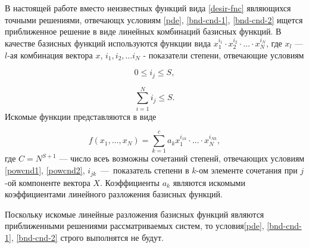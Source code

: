 \documentclass[a4paper,12pt]{article}
\begin{document}
В настоящей работе вместо неизвестных функций вида \eqref{desir-fnc}
являющихся точными решениями, отвечающх условиям \eqref{pde},
\eqref{bnd-cnd-1}, \eqref{bnd-cnd-2} ищется приближенное решение
в виде линейных комбинаций базисных функций. В качестве базисных функций
используются функции вида $x^{i_1}_1 \cdot x^{i_2}_2 \cdot \ldots \cdot
x^{i_N}_N$, где $x_l$ --- $l$-ая комбинация вектора $x$, $i_1,i_2,\ldots
i_N$ - показатели степени, отвечающие условиям

\begin{equation}
    0 \le i_j \le S,
    \label{powcnd1}
\end{equation}

\begin{equation}
    \sum^{N}_{i=1} i_j \le S.
    \label{powcnd2}
\end{equation}
Искомые функции представляются в виде

\begin{equation}
    f(x_1,\ldots,x_N)=\sum^{c}_{k=1} a_kx^{i_{1k}}_1 
    \cdot\ldots\cdot x^{i_{Nk}}_N,
    \label{poly}
\end{equation}
где $C=N^{S+1}$ --- число всеъ возможны сочетаний степенй, отвечающих 
условиям \eqref{powcnd1}, \eqref{powcnd2}, $i_{jk}$~---~показатель степени
в $k$-ом элементе сочетания при $j$-ой компоненте вектора $X$. Коэффициенты
$a_k$ являются искомыми коэффициентами линейного разложения базисных 
функций.

Поскольку искомые линейные разложения базисных функций являются 
приближенными решениями рассматриваемых систем, то условия\eqref{pde},
\eqref{bnd-cnd-1}, \eqref{bnd-cnd-2} строго выполнятся не будут.
\end{document}
